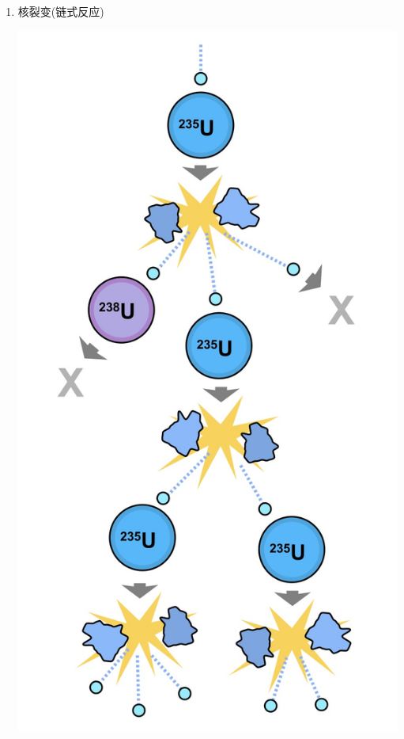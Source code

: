 \documentclass{article}
\begin{document}
\begin{enumerate}
          \vspace*{2em}

    \item 核裂变(链式反应)

          \begin{minipage}{0.26\textwidth}
              \includegraphics[width=\textwidth,keepaspectratio]{./pictures/21.png}
          \end{minipage}

\end{enumerate}
\end{document}
